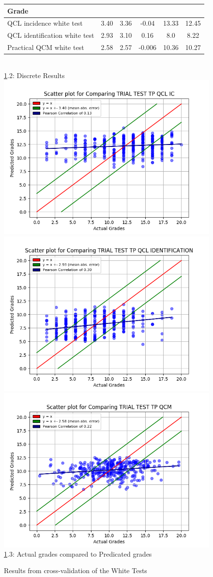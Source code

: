 \documentclass[a4paper,11pt]{report}
\numberwithin{figure}{chapter} %
\begin{document}
\begin{figure}[H]
\begin{tabular}{| l | c | c | c | c | c |}
{      Grade}\\ \hline
      \tiny{QCL incidence white test} & \tiny{3.40} & \tiny{3.36} & \tiny{-0.04} & \tiny{13.33} & \tiny{12.45}\\ \hline
      \tiny{QCL identification white test} & \tiny{2.93} & \tiny{3.10} & \tiny{0.16} & \tiny{8.0} & \tiny{8.22}\\ \hline
      \tiny{Practical QCM white test} & \tiny{2.58} & \tiny{2.57} & \tiny{-0.006} & \tiny{10.36} & \tiny{10.27}\\
      \hline
      \end{tabular}\\
      \vspace{0.5cm}
      \ref{fig:results_white}.2: Discrete Results\\
      \vspace{0.3cm}
      \includegraphics[width=.3\linewidth]{plots/cv_comp_TRIAL_TEST_TP_QCL_IC_2018-04-27_14_35_12.png}
  	  \includegraphics[width=.3\linewidth]{plots/cv_comp_TRIAL_TEST_TP_QCL_IDENTIFICATION_2018-04-27_14_31_55.png}
      \includegraphics[width=.3\linewidth]{plots/cv_comp_TRIAL_TEST_TP_QCM_2018-04-27_17_16_59.png}
      \\
      \ref{fig:results_white}.3: Actual grades compared to Predicated grades
      \caption{Results from cross-validation of the White Tests}
      \label{fig:results_white}
    \end{figure}
\end{document}

